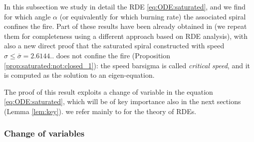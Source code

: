 \documentclass[reqno]{amsart}
\theoremstyle{definition} \newtheorem{definition}{Definition}[section]
\theoremstyle{definition} \newtheorem{remark}[definition]{Remark}
\theoremstyle{plain} \newtheorem{lemma}[definition]{Lemma}
\theoremstyle{plain} \newtheorem{proposition}[definition]{Proposition}
\theoremstyle{plain} \newtheorem{theorem}[definition]{Theorem}
\theoremstyle{plain} \newtheorem{corollary}[definition]{Corollary}
\theoremstyle{definition} \newtheorem{example}[definition]{Example}
\theoremstyle{plain} \newtheorem{claim}[clai]{Claim}
\theoremstyle{definition} \newtheorem{assumption}[definition]{Assumption}
\theoremstyle{definition} \newtheorem{observation}[definition]{Observation}
\newcommand{\1}{\mathbbm 1}
\numberwithin{equation}{section} %
\theoremstyle{plain} \newtheorem*{theorem*}{Theorem}
\theoremstyle{plain} \newtheorem{mthm}[maintheorem]{Main Theorem}
\theoremstyle{plain} \newtheorem*{mthm*}{Main Theorem}
\theoremstyle{plain} \newtheorem*{conjecture*}{Conjecture}
\theoremstyle{plain} \newtheorem{conjecture}[definition]{Conjecture}
\theoremstyle{plain} \newtheorem*{problem*}{Problem}
\begin{document}
In this subsection we study in detail the RDE \eqref{eq:ODE:saturated}, and we find for which angle $\alpha$ (or equivalently for which burning rate) the associated spiral confines the fire. Part of these results have been already obtained in \cite{firefighter} (we repeat them for completeness using a different approach based on RDE analysis), with also a new direct proof that the saturated spiral constructed with speed $\sigma \leq \bar \sigma = 2.6144..$ does not confine the fire (Proposition \ref{prop:saturated:not:closed_1}): the speed \gls{barsigma} is called \emph{critical speed}, and it is computed as the solution to an eigen-equation.

The proof of this result exploits a change of variable in the equation \eqref{eq:ODE:saturated}, which will be of key importance also in the next sections (Lemma \ref{lem:key}). we refer mainly to \cite{RDE} for the theory of RDEs.


\subsubsection{Change of variables}
\label{Sss:change_variables}
\end{document}
